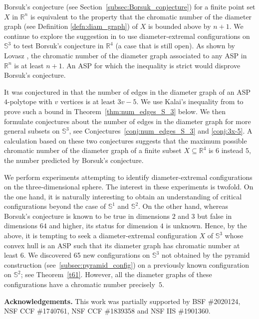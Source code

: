 \documentclass[12pt]{amsart}
\theoremstyle{plain}
\newcommand{\R}{\mathbb{R}}
\newcommand{\Sp}{\mathbb{S}}
\numberwithin{equation}{section}
\begin{document}
 Borsuk's conjecture (see Section~\ref{subsec:Borsuk_conjecture}) for
 a finite point set $X$ in $\R^n$ is equivalent to the property that
 the chromatic number of the diameter graph (see Definition
 \ref{defn:diam_graph}) of $X$ is bounded above by $n+1$.  We continue
 to explore the suggestion in \cite{katz1989diameter} to use
 diameter-extremal configurations on $\Sp^3$ to test Borsuk's
 conjecture in $\R^4$ (a case that is still open).  As shown by Lovasz
 \cite{lovasz1983self}, the chromatic number of the diameter graph
 associated to any ASP in $\R^n$ is at least $n+1$.  An ASP for which
 the inequality is strict would disprove Borsuk's conjecture.

It was conjectured in \cite{katz1989diameter} that the number of edges
in the diameter graph of an ASP $4$-polytope with $v$ vertices is at
least $3v-5$.  We use Kalai's inequality from \cite[Section~4.3]{Ka94}
to prove such a bound in Theorem~\ref{thm:num_edges_S_3} below.
We then formulate conjectures about the number of edges in
  the diameter graph for more general subsets on $\Sp^3$, see
  Conjectures~\ref{conj:num_edges_S_3} and \ref{conj:3x-5}.  A
  calculation based on these two conjectures suggests that the maximum
  possible chromatic number of the diameter graph of a finite subset
  $X\subseteq \R^4$ is $6$ instead $5$, the number predicted by
  Borsuk's conjecture.
%

We perform experiments attempting to identify diameter-extremal
configurations on the three-dimensional sphere.  The interest in these
experiments is twofold.  On the one hand, it is naturally interesting
to obtain an understanding of critical configurations beyond the case
of $\Sp^1$ and $\Sp^2$.  On the other hand, whereas Borsuk's
conjecture is known to be true in dimensions $2$ and $3$ but false in
dimensions $64$ and higher, its status for dimension $4$ is unknown.
Hence, by the above, it is tempting to seek a diameter-extremal
configuration $X$ of $\Sp^3$ whose convex hull is an ASP such that its
diameter graph has chromatic number at least $6$.
We discovered 65 new configurations on $\Sp^3$ not obtained
  by the pyramid construction (see~\ref{subsec:pyramid_config}) on a
  previously known configuration on $\Sp^2$; see Theorem~\ref{t61}.
However, all the diameter graphs of these configurations have a
chromatic number precisely~$5$.%

\medskip

\noindent
\textbf{Acknowledgements.} This work was partially supported by BSF \#2020124, NSF CCF \#1740761, NSF CCF \#1839358 and NSF IIS \#1901360.
\end{document}
